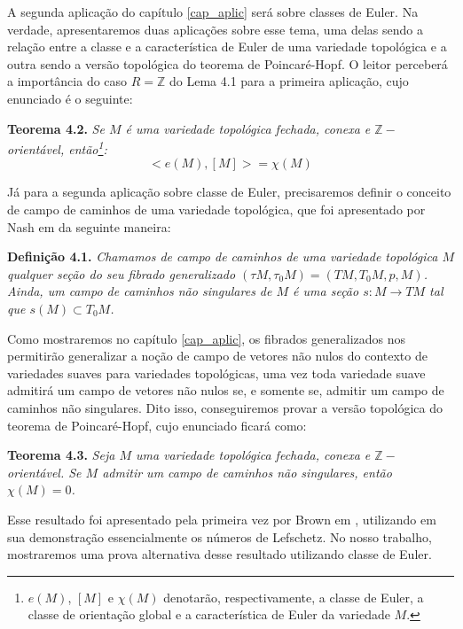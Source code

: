 \documentclass[12pt,oneside]{book} %
\newcommand{\Z}{\mathbb{Z}}
\begin{document}
\par A segunda aplicação do capítulo \ref{cap_aplic} será sobre classes de Euler. Na verdade, apresentaremos duas aplicações sobre esse tema, uma delas sendo a relação entre a classe e a característica de Euler de uma variedade topológica e a outra sendo a versão topológica do teorema de Poincaré-Hopf. O leitor perceberá a importância do caso $R=\Z$ do Lema 4.1 para a primeira aplicação, cujo enunciado é o seguinte:\newline

\par\textbf{Teorema 4.2. }\textit{Se $M$ é uma variedade topológica fechada, conexa e $\Z-$orientável, então\footnote{$e(M)$, $[M]$ e $\chi(M)$ denotarão, respectivamente, a classe de Euler, a classe de orientação global e a característica de Euler da variedade $M$.}:
	$$ <e(M),[M]>=\chi(M) $$}

\par Já para a segunda aplicação sobre classe de Euler, precisaremos definir o conceito de campo de caminhos de uma variedade topológica, que foi apresentado por Nash em \cite{nash} da seguinte maneira:\newline

\par\textbf{Definição 4.1. }\textit{Chamamos de campo de caminhos de uma variedade topológica $M$ qualquer seção do seu fibrado generalizado $(\tau M,\tau_{0}M)=(TM,T_{0}M,p,M)$. Ainda, um campo de caminhos não singulares de $M$ é uma seção $s:M\to TM$ tal que $s(M)\subset T_{0}M$.}\newline

\par Como mostraremos no capítulo \ref{cap_aplic}, os fibrados generalizados nos permitirão generalizar a noção de campo de vetores não nulos do contexto de variedades suaves para variedades topológicas, uma vez toda variedade suave admitirá um campo de vetores não nulos se, e somente se, admitir um campo de caminhos não singulares. Dito isso, conseguiremos provar a versão topológica do teorema de Poincaré-Hopf, cujo enunciado ficará como:\newline

\par\textbf{Teorema 4.3. }\textit{Seja $M$ uma variedade topológica fechada, conexa e $\Z-$orientável. Se $M$ admitir um campo de caminhos não singulares, então $\chi(M)=0$.}\newline

\par Esse resultado foi apresentado pela primeira vez por Brown em \cite{brown}, utilizando em sua demonstração essencialmente os números de Lefschetz. No nosso trabalho, mostraremos uma prova alternativa desse resultado utilizando classe de Euler.
\end{document}
